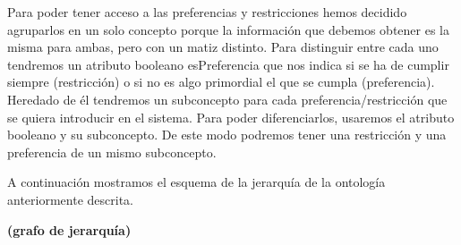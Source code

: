 Para poder tener acceso a las preferencias y restricciones hemos decidido
agruparlos en un solo concepto porque la información que debemos obtener es
la misma para ambas, pero con un matiz distinto. Para distinguir entre cada
uno tendremos un atributo booleano esPreferencia que  nos indica si se ha
de cumplir siempre (restricción) o si no es algo primordial el que se cumpla
(preferencia). Heredado de él tendremos un subconcepto para cada
preferencia/restricción que se quiera introducir en el sistema. Para poder
diferenciarlos, usaremos el atributo booleano y su subconcepto. De este modo
podremos tener una restricción y una preferencia de un mismo subconcepto.

A continuación mostramos el esquema de la jerarquía de la ontología
anteriormente descrita.

\textbf{(grafo de jerarquía)}
